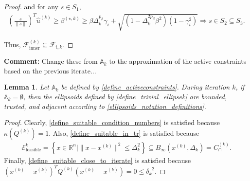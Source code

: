 \documentclass{article}
\newenvironment{comment}
  {\par\medskip
   \color{red}%
   \begin{framed}
   \textbf{Comment: }\ignorespaces}
 {\end{framed}
  \medskip}
\newtheorem{lemma}[theorem]{Lemma}
\theoremstyle{case}
\numberwithin{theorem}{subsection}
\newcommand{\activeconstraintsk}{{\mathbb A_{k}}}
\newcommand{\bs}{{\beta^{(\star, k)}}}
\newcommand{\capcones}{{C^{(k)}_{\cap}}}
\newcommand{\dk}{\Delta_k}
\newcommand{\fcki}{{\mathcal {F}^{(k)}_{\textrm{inner}}}}
\newcommand{\fik}{{\mathcal F_{i, k}}}
\newcommand{\huk}{{{\hat u}^{(k)}}}
\newcommand{\qk}{{Q^{(k)}}}
\newcommand{\Rn}{\mathbb R^n}
\newcommand{\sdk}{{\delta_k}}
\newcommand{\tr}{{ B_{\infty}\left(\xk, \dk\right) }}
\newcommand{\unshiftedellipsoid}{{\mathcal E^k_{\textrm{feasible}}}}
\newcommand{\xk}{{x^{(k)}}}
\begin{document}
\begin{proof}
and for any $s\in S_1$,
\begin{align*}
\left(\frac{s}{\|s\|}\right)^T\huk \ge \bs 
\ge \beta\dk^{p_{\beta}}\gamma_i + \sqrt{(1 - \dk^{2p_{\beta}}\beta^2)\left(1 - \gamma_i^2\right)}
\Longrightarrow s \in S_2 \subseteq S_3.
\end{align*}

Thus, $\fcki \subseteq \fik$.
\end{proof}


\begin{comment}
Change these from $\activeconstraintsk$ to the approximation of the active constraints based on the previous iterate...
\end{comment}
\begin{lemma}
\label{ellsoid_is_suitable_theorem_p1}
Let $\activeconstraintsk$ be defined by \cref{define_activeconstraints}.
During iteration $k$, if $\activeconstraintsk = \emptyset$, then the ellipsoids defined by \cref{define_trivial_ellipsek} 
are bounded, trusted, and adjacent according to \cref{ellipsoids_notation_definitions}.

\end{lemma}
\begin{proof}
Clearly, \cref{define_suitable_condition_numbers} is satisfied because $\kappa(\qk) = 1$.
Also, \cref{define_suitable_in_tr} is satisfied because 
\begin{align*}
\unshiftedellipsoid = \left\{x \in \Rn | \|x - \xk\|^2 \le \dk^2 \right\} \subseteq \tr = \capcones.
\end{align*}
Finally, \cref{define_suitable_close_to_iterate} is satisfied because $(\xk - \xk)^T\qk(\xk - \xk) = 0 \le \sdk^2$.
\end{proof}
\end{document}
